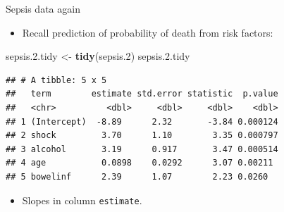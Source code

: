 \documentclass[ignorenonframetext,]{beamer}
\newenvironment{Shaded}{\begin{snugshade}}{\end{snugshade}}
\newcommand{\FloatTok}[1]{\textcolor[rgb]{0.00,0.00,0.81}{#1}}
\newcommand{\KeywordTok}[1]{\textcolor[rgb]{0.13,0.29,0.53}{\textbf{#1}}}
\newcommand{\NormalTok}[1]{#1}
\newcommand{\StringTok}[1]{\textcolor[rgb]{0.31,0.60,0.02}{#1}}
\providecommand{\tightlist}{%
  \setlength{\itemsep}{0pt}\setlength{\parskip}{0pt}}
\begin{document}
\begin{frame}[fragile]{Sepsis data again}
\protect\hypertarget{sepsis-data-again}{}

\begin{itemize}
\tightlist
\item
  Recall prediction of probability of death from risk factors:
\end{itemize}

\begin{Shaded}
\begin{Highlighting}[]
\NormalTok{sepsis.}\FloatTok{2.}\NormalTok{tidy <-}\StringTok{ }\KeywordTok{tidy}\NormalTok{(sepsis}\FloatTok{.2}\NormalTok{)}
\NormalTok{sepsis.}\FloatTok{2.}\NormalTok{tidy}
\end{Highlighting}
\end{Shaded}

\begin{verbatim}
## # A tibble: 5 x 5
##   term        estimate std.error statistic  p.value
##   <chr>          <dbl>     <dbl>     <dbl>    <dbl>
## 1 (Intercept)  -8.89      2.32       -3.84 0.000124
## 2 shock         3.70      1.10        3.35 0.000797
## 3 alcohol       3.19      0.917       3.47 0.000514
## 4 age           0.0898    0.0292      3.07 0.00211 
## 5 bowelinf      2.39      1.07        2.23 0.0260
\end{verbatim}

\begin{itemize}
\tightlist
\item
  Slopes in column \texttt{estimate}.
\end{itemize}

\end{frame}
\end{document}
